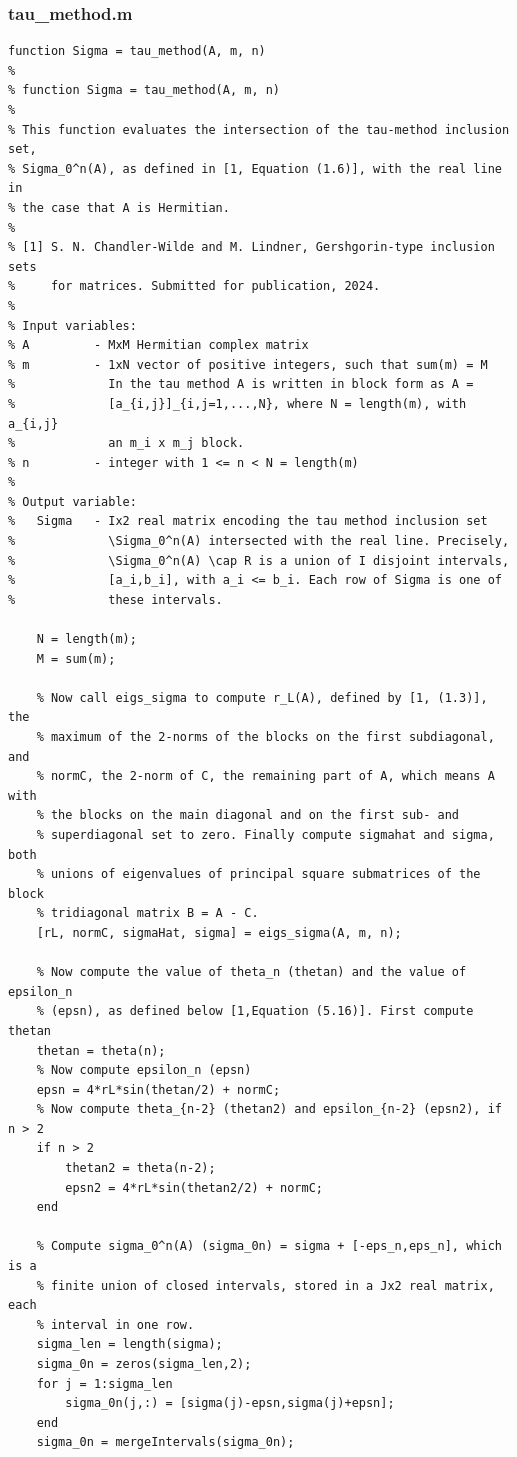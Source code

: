 \documentclass[preprint,1p,11pt]{elsarticle}
\numberwithin{equation}{section}   %
\numberwithin{figure}{section}  %
\begin{document}
\subsubsection{tau\_method.m} \label{code:tm}

\begin{verbatim}
function Sigma = tau_method(A, m, n)
%
% function Sigma = tau_method(A, m, n)
%
% This function evaluates the intersection of the tau-method inclusion set, 
% Sigma_0^n(A), as defined in [1, Equation (1.6)], with the real line in
% the case that A is Hermitian. 
%
% [1] S. N. Chandler-Wilde and M. Lindner, Gershgorin-type inclusion sets
%     for matrices. Submitted for publication, 2024.
%
% Input variables:
% A         - MxM Hermitian complex matrix
% m         - 1xN vector of positive integers, such that sum(m) = M
%             In the tau method A is written in block form as A = 
%             [a_{i,j}]_{i,j=1,...,N}, where N = length(m), with a_{i,j}
%             an m_i x m_j block.
% n         - integer with 1 <= n < N = length(m)
%
% Output variable:
%   Sigma   - Ix2 real matrix encoding the tau method inclusion set
%             \Sigma_0^n(A) intersected with the real line. Precisely, 
%             \Sigma_0^n(A) \cap R is a union of I disjoint intervals, 
%             [a_i,b_i], with a_i <= b_i. Each row of Sigma is one of 
%             these intervals.

    N = length(m);
    M = sum(m);

    % Now call eigs_sigma to compute r_L(A), defined by [1, (1.3)], the 
    % maximum of the 2-norms of the blocks on the first subdiagonal, and
    % normC, the 2-norm of C, the remaining part of A, which means A with
    % the blocks on the main diagonal and on the first sub- and
    % superdiagonal set to zero. Finally compute sigmahat and sigma, both
    % unions of eigenvalues of principal square submatrices of the block
    % tridiagonal matrix B = A - C.
    [rL, normC, sigmaHat, sigma] = eigs_sigma(A, m, n);

    % Now compute the value of theta_n (thetan) and the value of epsilon_n 
    % (epsn), as defined below [1,Equation (5.16)]. First compute thetan
    thetan = theta(n);
    % Now compute epsilon_n (epsn)
    epsn = 4*rL*sin(thetan/2) + normC;
    % Now compute theta_{n-2} (thetan2) and epsilon_{n-2} (epsn2), if n > 2
    if n > 2
        thetan2 = theta(n-2);
        epsn2 = 4*rL*sin(thetan2/2) + normC;
    end
    
    % Compute sigma_0^n(A) (sigma_0n) = sigma + [-eps_n,eps_n], which is a
    % finite union of closed intervals, stored in a Jx2 real matrix, each
    % interval in one row.
    sigma_len = length(sigma);
    sigma_0n = zeros(sigma_len,2);
    for j = 1:sigma_len
        sigma_0n(j,:) = [sigma(j)-epsn,sigma(j)+epsn];
    end
    sigma_0n = mergeIntervals(sigma_0n);


\end{verbatim}
\end{document}
